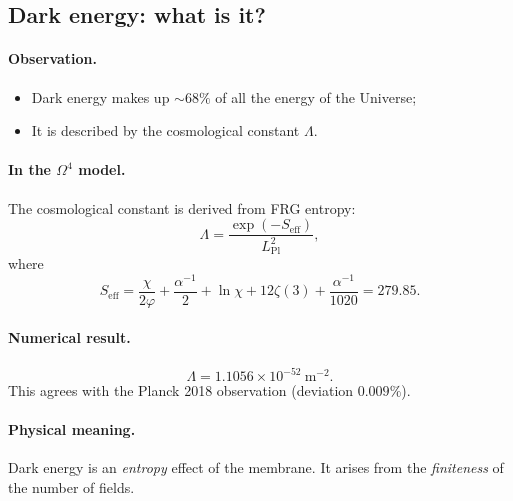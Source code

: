 \documentclass[11pt,a4paper]{article}
\newcommand{\Om}{\Omega^4}
\theoremstyle{definition}
\begin{document}
\subsection{Dark energy: what is it?}
\label{subsec:dark-energy}

\paragraph{Observation.}
\begin{itemize}
    \item Dark energy makes up $\sim 68\%$ of all the energy 
          of the Universe;
    \item It is described by the cosmological constant $\Lambda$.
\end{itemize}

\paragraph{In the $\Om$ model.}
The cosmological constant is derived from FRG entropy:
\begin{equation}
    \boxed{
    \Lambda = \frac{\exp(-S_{\text{eff}})}{L_{\text{Pl}}^2},
    }
    \label{eq:lambda-dm}
\end{equation}
where
\begin{equation}
    S_{\text{eff}} = \frac{\chi}{2\varphi} + \frac{\alpha^{-1}}{2} 
    + \ln \chi + 12 \zeta(3) + \frac{\alpha^{-1}}{1020}
    = 279.85.
\end{equation}

\paragraph{Numerical result.}
\begin{equation}
    \Lambda = 1.1056 \times 10^{-52}~\text{m}^{-2}.
\end{equation}
This agrees with the Planck 2018 observation 
(deviation $0.009\%$).

\paragraph{Physical meaning.}
Dark energy is an \emph{entropy} effect of the membrane. 
It arises from the \emph{finiteness} of the number of fields.

\end{document}
